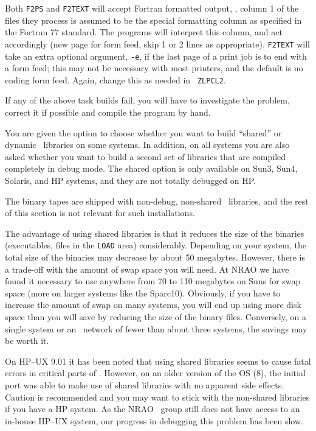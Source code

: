 Both {\tt F2PS} and {\tt F2TEXT} will accept Fortran formatted output,
\ie, column 1 of the files they process is assumed to be the special
formatting column as specified in the Fortran 77 standard.  The programs
will interpret this column, and act accordingly (new page for form feed,
skip 1 or 2 lines as appropriate).  {\tt F2TEXT} will take an extra
optional argument, {\tt -e}, if the last page of a print job is to end
with a form feed; this may not be necessary with most printers, and the
default is no ending form feed.  Again, change this as needed in {\tt
ZLPCL2}.

If any of the above task builds fail, you will have to investigate the
problem, correct it if possible and compile the program by hand.

\medskip{}

You are given the option to choose whether you want to build ``shared''
or dynamic \AIPS\ libraries on some systems.  In addition, on all
systems you are also asked whether you want to build a second set of
libraries that are compiled completely in debug mode.  The shared option
is only available on Sun3, Sun4, Solaris, and HP systems, and they are
not totally debugged on HP.

The binary tapes are shipped with non-debug, non-shared \AIPS\ libraries,
and the rest of this section is not relevant for such installations.

The advantage of using shared libraries is that it reduces the size of the
binaries (executables, files in the {\tt LOAD} area) considerably.
Depending on your system, the total size of the binaries may decrease by
about 50 megabytes.  However, there is a trade-off with the amount of swap
space you will need.  At NRAO we have found it necessary to use anywhere
from 70 to 110 megabytes on Suns for swap space (more on larger systems
like the Sparc10).  Obviously, if you have to increase the amount of swap
on many systems, you will end up using more disk space than you will save
by reducing the size of the binary files.  Conversely, on a single system
or an \AIPS\ network of fewer than about three systems, the savings may be
worth it.

On HP--UX 9.01 it has been noted that using shared libraries seems to
cause fatal errors in critical parts of \AIPS.  However, on an older
version of the OS (8), the initial port was able to make use of shared
libraries with no apparent side effects.  Caution is recommended and you
may want to stick with the non-shared libraries if you have a HP system.
As the NRAO \AIPS\ group still does not have access to an in-house HP--UX
system, our progress in debugging this problem has been slow.

